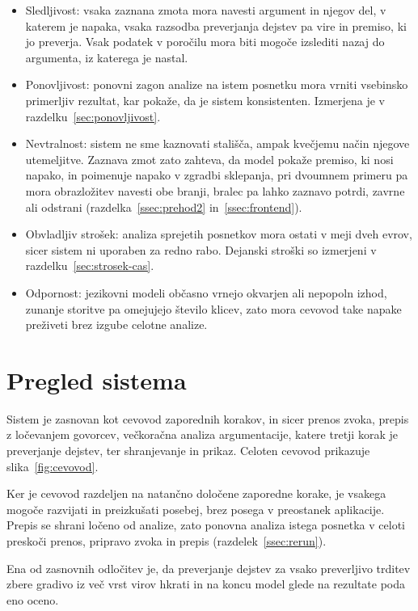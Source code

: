 \documentclass[a4paper, 12pt]{book}
\begin{document}
\begin{itemize}
\item Sledljivost: vsaka zaznana zmota mora navesti argument in njegov
del, v katerem je napaka, vsaka razsodba preverjanja dejstev pa vire in premiso,
ki jo preverja. Vsak podatek v poročilu mora biti mogoče izslediti nazaj do
argumenta, iz katerega je nastal.
\item Ponovljivost: ponovni zagon analize na istem posnetku mora vrniti
vsebinsko primerljiv rezultat, kar pokaže, da je sistem konsistenten. Izmerjena
je v razdelku~\ref{sec:ponovljivost}.
\item Nevtralnost: sistem ne sme kaznovati stališča, ampak kvečjemu
način njegove utemeljitve. Zaznava zmot zato zahteva, da model pokaže premiso, ki nosi napako, in poimenuje napako v zgradbi sklepanja, pri dvoumnem primeru pa mora obrazložitev navesti obe branji, bralec pa lahko zaznavo
potrdi, zavrne ali odstrani (razdelka~\ref{ssec:prehod2} in~\ref{ssec:frontend}).
\item Obvladljiv strošek: analiza sprejetih posnetkov mora ostati v
meji dveh evrov, sicer sistem ni uporaben za redno rabo. Dejanski stroški so
izmerjeni v razdelku~\ref{sec:strosek-cas}.
\item Odpornost: jezikovni modeli občasno vrnejo okvarjen ali nepopoln
izhod, zunanje storitve pa omejujejo število klicev, zato mora cevovod take
napake preživeti brez izgube celotne analize.
\end{itemize}


\section{Pregled sistema}
\label{sec:cevovod}

Sistem je zasnovan kot cevovod zaporednih korakov, in sicer prenos zvoka, prepis z ločevanjem govorcev, večkoračna analiza argumentacije, katere tretji korak je preverjanje dejstev, ter shranjevanje in prikaz. Celoten cevovod prikazuje slika~\ref{fig:cevovod}.

Ker je cevovod razdeljen na natančno določene zaporedne korake, je vsakega
mogoče razvijati in preizkušati posebej, brez posega v preostanek aplikacije.
Prepis se shrani ločeno od analize, zato ponovna analiza istega posnetka
v celoti preskoči prenos, pripravo zvoka in prepis (razdelek~\ref{ssec:rerun}).

Ena od zasnovnih odločitev je, da preverjanje dejstev za vsako preverljivo
trditev zbere gradivo iz več vrst virov hkrati in na koncu model glede na rezultate poda eno oceno.
\end{document}
